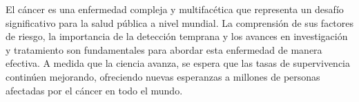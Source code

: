 El cáncer es una enfermedad compleja y multifacética que representa un desafío significativo para la salud pública a nivel mundial. La comprensión de sus factores de riesgo, la importancia de la detección temprana y los avances en investigación y tratamiento son fundamentales para abordar esta enfermedad de manera efectiva. A medida que la ciencia avanza, se espera que las tasas de supervivencia continúen mejorando, ofreciendo nuevas esperanzas a millones de personas afectadas por el cáncer en todo el mundo.
